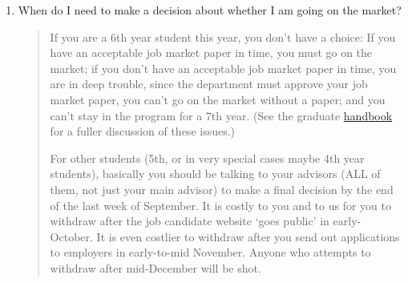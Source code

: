 \documentclass{\classes/econtex}
\begin{document}
\begin{enumerate}
\begin{quote}
  \end{quote}

\item  When do I need to make a decision about whether I am going on
  the market?

  \begin{quote}
    If you are a 6th year student this year, you don't have a choice: If
    you have an acceptable job market paper in time, you must go on the
    market; if you don't have an acceptable job market paper in time, you
    are in deep trouble, since the department must approve your job market
    paper, you can't go on the market without a paper; and you can't stay
    in the program for a 7th year.  (See the graduate \href{http://www.econ2.jhu.edu/pdf/Econ\_Grad\_Handbook.pdf}{handbook} for a fuller discussion of these issues.) 

    For other students (5th, or in very special cases maybe 4th year students), basically you should be talking to your advisors (ALL of them, not just your main advisor) to make a final decision by the end of the last week of September.  It is costly to you and to us for you to withdraw after the job candidate website `goes public' in early-October.  It is even costlier to withdraw after you send out applications to employers in early-to-mid November.  Anyone who attempts to withdraw after mid-December will be shot.

    \begin{comment}

      In the dept meeting on 2006-10-17 a question was raised about
      whether we are really serious about our policy, as stated by Larry,
      that ``there is no such thing as a 7th year student.''  

      The answer is yes.

      There was then some discussion about the relationship between going
      on the job market and remaining in the program, caused by the fact
      that there are currently three students (Tereanu, Svitil, Lu) who
      are clearly not ready for the job market but have not given up all
      hope of finishing a dissertation by August of next year.

      The resolution (subsequently clarified in emails on 2006-10-18 and
      2006-10-19 and an email to Zhou Lu on 2006-10-19 from CDC) was as
      follows.

      Our declared public policy (see the graduate \href{handbook}{http://www.econ2.jhu.edu/pdf/Econ_Grad_Handbook.pdf}) is that nobody can enroll for a 7th year
      in the program.  In practice, if in the opinion of an advisor and
      second advisor, a student's dissertation is essentially complete as
      of August of the 6th year, we may relax this rigor slightly in order
      to arrange a defense and final ``cleaning up'' of details - but \textit{  only} in the case where the dissertation is in all essentials
      complete.


\end{comment}
\end{quote}
\end{enumerate}
\end{document}
